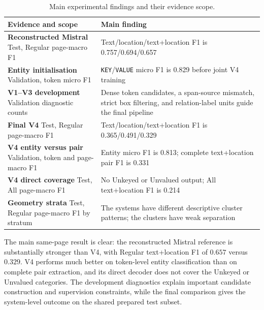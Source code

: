 \begin{table}[ht]
  \centering
  \caption{Main experimental findings and their evidence scope.}
  \label{tab:full-progression}
  \footnotesize
  \begin{tabular}{@{}
    >{\raggedright\arraybackslash}p{5.4cm}
    >{\raggedright\arraybackslash}p{9.8cm}
  @{}}
    \toprule
    \textbf{Evidence and scope} & \textbf{Main finding} \\
    \midrule
    \textbf{Reconstructed Mistral}\newline
    Test, Regular page-macro F1
      & Text/location/text+location F1 is 0.757/0.694/0.657 \\
    \addlinespace[3pt]
    \textbf{Entity initialisation}\newline
    Validation, token micro F1
      & \texttt{KEY}/\texttt{VALUE} micro F1 is 0.829 before joint V4 training \\
    \addlinespace[3pt]
    \textbf{V1--V3 development}\newline
    Validation diagnostic counts
      & Dense token candidates, a span-source mismatch, strict box filtering, and relation-label units guide the final pipeline \\
    \addlinespace[3pt]
    \textbf{Final V4}\newline
    Test, Regular page-macro F1
      & Text/location/text+location F1 is 0.365/0.491/0.329 \\
    \addlinespace[3pt]
    \textbf{V4 entity versus pair}\newline
    Validation, token and page-macro F1
      & Entity micro F1 is 0.813; complete text+location pair F1 is 0.331 \\
    \addlinespace[3pt]
    \textbf{V4 direct coverage}\newline
    Test, All page-macro F1
      & No Unkeyed or Unvalued output; All text+location F1 is 0.214 \\
    \addlinespace[3pt]
    \textbf{Geometry strata}\newline
    Test, Regular page-macro F1 by stratum
      & The systems have different descriptive cluster patterns; the clusters have weak separation \\
    \bottomrule
  \end{tabular}
\end{table}

The main same-page result is clear: the reconstructed Mistral reference is
substantially stronger than V4, with Regular text+location F1 of $0.657$ versus
$0.329$. V4 performs much better on token-level entity classification than on
complete pair extraction, and its direct decoder does not cover the Unkeyed or
Unvalued categories. The development diagnostics explain important candidate
construction and supervision constraints, while the final comparison gives the
system-level outcome on the shared prepared test subset.
